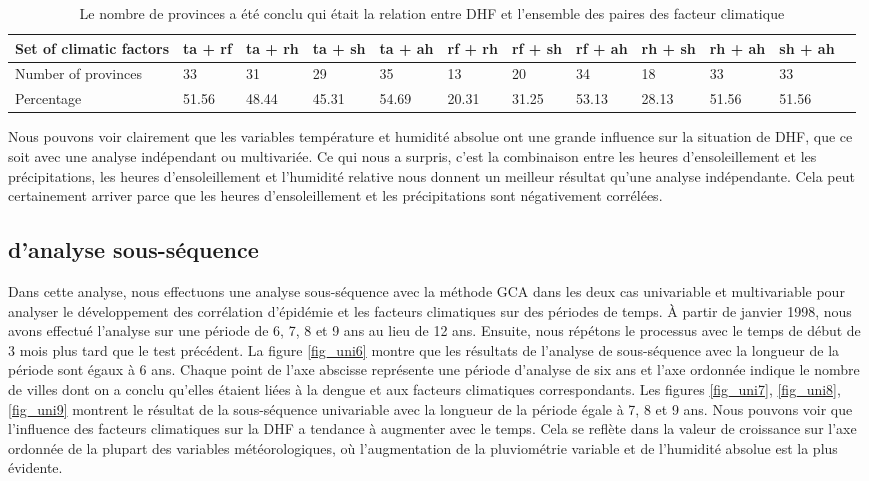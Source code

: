 \begin{table}[h]
\begin{tabular} { | p{1.9cm} |  p{0.9cm} | p{0.9cm} | p{0.9cm} | p{0.9cm} | p{0.9cm} | p{0.9cm} | p{0.9cm} | p{0.9cm} | p{0.9cm} | p{0.9cm} | p{0.9cm} |}
\hline
Set of climatic factors & ta + rf & ta + rh & ta + sh & ta + ah & rf + rh & rf + sh & rf + ah & rh + sh & rh + ah & sh + ah \\
\hline
Number of provinces & 33 & 31 & 29 & 35 & 13 & 20 & 34 & 18 & 33 & 33 \\
\hline
Percentage & 51.56 & 48.44 & 45.31 & 54.69 & 20.31 & 31.25 & 53.13 & 28.13 & 51.56 & 51.56 \\
\hline
\end{tabular}
\caption{Le nombre de provinces a été conclu qui était la relation entre DHF et l'ensemble des paires des facteur climatique} 
\label{table2}
\end{table}

Nous pouvons voir clairement que les variables température et humidité absolue ont une grande influence sur la situation de DHF, que ce soit avec une analyse indépendant ou multivariée. Ce qui nous a surpris, c'est la combinaison entre les heures d'ensoleillement et les précipitations, les heures d'ensoleillement et l'humidité relative nous donnent un meilleur résultat qu'une analyse indépendante. Cela peut certainement arriver parce que les heures d'ensoleillement et les précipitations sont négativement corrélées.
 
\subsection{\Rs d'analyse sous-séquence}

Dans cette analyse, nous effectuons une analyse sous-séquence  avec la méthode  GCA dans les deux cas univariable et multivariable pour analyser le développement des corrélation  d'épidémie et les facteurs climatiques sur des périodes de temps. À partir de janvier 1998, nous avons effectué l’analyse sur une période de 6, 7, 8 et 9 ans au lieu de 12 ans. Ensuite, nous répétons le processus avec le temps de début de 3 mois plus tard que le test précédent. La figure \ref{fig_uni6} montre que les résultats de l'analyse de sous-séquence avec la longueur de la période sont égaux à 6 ans. Chaque point de l'axe abscisse représente une période d'analyse de six ans et l'axe ordonnée indique le nombre de villes dont on a conclu qu'elles étaient liées à la dengue et aux facteurs climatiques correspondants. Les figures \ref{fig_uni7}, \ref{fig_uni8}, \ref{fig_uni9} montrent le résultat de la sous-séquence univariable avec la longueur de la période égale à 7, 8 et 9 ans. Nous pouvons voir que l'influence des facteurs climatiques sur la DHF a tendance à augmenter avec le temps. Cela se reflète dans la valeur de croissance sur l'axe ordonnée de la plupart des variables météorologiques, où l'augmentation de la pluviométrie variable et de l'humidité absolue est la plus évidente. 


